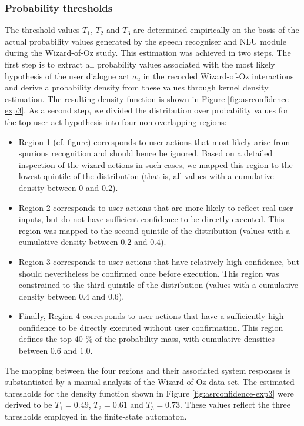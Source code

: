 \subsubsection*{Probability thresholds}

The threshold values $T_1$, $T_2$ and $T_3$ are determined empirically on the basis of the actual probability values generated by the speech recogniser and NLU module during the Wizard-of-Oz study.  This estimation was achieved in two steps.  The first step is to extract all probability values associated with the most likely hypothesis of the user dialogue act $a_u$ in the recorded Wizard-of-Oz interactions and derive a probability density from these values through kernel density estimation. The resulting density function is shown in Figure \ref{fig:asrconfidence-exp3}. As a second step, we divided the distribution over probability values for the top user act hypothesis into four non-overlapping regions:
\begin{itemize}
\item Region 1 (cf. figure) corresponds to user actions that most likely arise from spurious recognition and should hence be ignored. Based on a detailed inspection of the wizard actions in such cases, we mapped this region to the lowest quintile of the distribution (that is, all values with a cumulative density between $0$ and $0.2$). 
\item Region 2 corresponds to user actions that are more likely to reflect real user inputs, but do not have sufficient confidence to be directly executed.  This region was mapped to the second quintile of the distribution (values with a cumulative density between $0.2$ and $0.4$).
\item Region 3 corresponds to user actions that have relatively high confidence, but should nevertheless be confirmed once before execution.  This region was constrained to the third quintile of the distribution (values with a cumulative density between $0.4$ and $0.6$).
\item Finally, Region 4 corresponds to user actions that have a sufficiently high confidence to be directly executed without user confirmation. This region defines the top 40 \% of the probability mass, with cumulative densities between $0.6$ and $1.0$.
\end{itemize}

The mapping between the four regions and their associated system responses is substantiated by a manual analysis of the Wizard-of-Oz data set. The estimated thresholds for the density function shown in Figure \ref{fig:asrconfidence-exp3} were derived to be $T_1 = 0.49$, $T_2 = 0.61$ and $T_3 = 0.73$. These values reflect the three thresholds employed in the finite-state automaton. 

